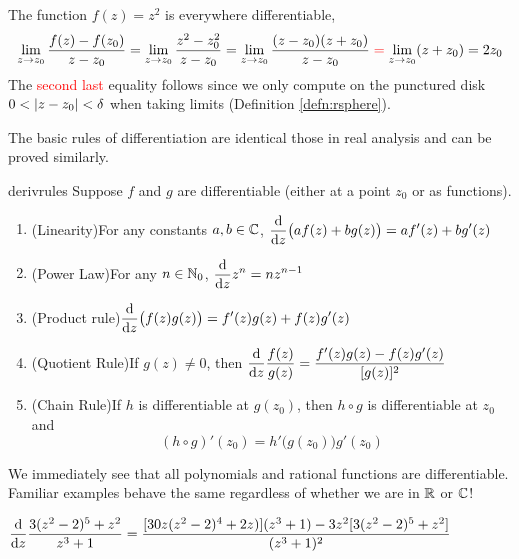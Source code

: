 

\begin{example}{}{}
	The function $f(z)=z^2$ is everywhere differentiable,
  \[
  	\lim_{z\to z_0}\frac{f(z)-f(z_0)}{z-z_0} =\lim_{z\to z_0}\frac{z^2-z_0^2}{z-z_0} =\lim_{z\to z_0}\frac{(z-z_0)(z+z_0)}{z-z_0} \mathrel{\textcolor{red}{=}} \lim_{z\to z_0}(z+z_0) =2z_0
  \]
	The \textcolor{red}{second last} equality follows since we only compute on the punctured disk $0<\left| z-z_0\right|<\delta$ when taking limits (Definition \ref{defn:rsphere}).
\end{example}


The basic rules of differentiation are identical those in real analysis and can be proved similarly.

\begin{thm}{}{derivrules}
	Suppose $f$ and $g$ are differentiable (either at a point $z_0$ or as functions).
	\begin{enumerate}
	  \item (Linearity)\quad For any constants $a,b\in\mathbb{C}$, $\displaystyle\frac{\mathrm{d} }{\mathrm{d} z}\bigl(af(z)+bg(z)\bigr)=af'(z)+bg'(z)$
	  \item (Power Law)\quad For any $n\in\mathbb{N}_0$, $\displaystyle\frac{\mathrm{d} }{\mathrm{d} z}z^n=nz^{n-1}$
	  \item (Product rule)\quad $\displaystyle\frac{\mathrm{d} }{\mathrm{d} z}\bigl(f(z)g(z)\bigr)=f'(z)g(z)+f(z)g'(z)$
	  \item (Quotient Rule)\quad If $g(z)\neq 0$, then $\displaystyle\frac{\mathrm{d} }{\mathrm{d} z}\frac{f(z)}{g(z)}=\frac{f'(z)g(z)-f(z)g'(z)}{[g(z)]^2}$
	  \item (Chain Rule)\quad If $h$ is differentiable at $g(z_0)$, then $h\circ g$ is differentiable at $z_0$ and
	  \[
	  	(h\circ g)'(z_0)=h'\bigl(g(z_0)\bigr)g'(z_0)
	  \]
	\end{enumerate}
\end{thm}

We immediately see that all polynomials and rational functions are differentiable. Familiar examples behave the same regardless of whether we are in $\mathbb{R}$ or $\mathbb{C}$!

\begin{example}{}{}
  $\displaystyle\frac{\mathrm{d} }{\mathrm{d} z}\frac{3(z^2-2)^5+z^2}{z^3+1} = \frac{[30z(z^2-2)^4+2z)](z^3+1) -3z^2[3(z^2-2)^5+z^2]}{(z^3+1)^2}$
\end{example}


